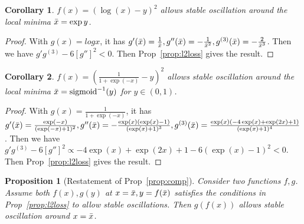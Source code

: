 \documentclass{article}
\theoremstyle{plain}
\newtheorem{coro}{Corollary}
\newtheorem{prop}{Proposition}
\theoremstyle{remark}
\newcommand{\T}[1]{^{(#1)}}
\begin{document}
\begin{coro}
    $f(x)=(\log(x)-y)^2$ allows stable oscillation around the local minima $\Bar{x}=\exp{y}$.
    \label{cor:log}
\end{coro}
\begin{proof}
    With $g(x)=log{x}$, it has $g'(\Bar{x})=\frac{1}{\Bar{x}}, g''(\Bar{x})=-\frac{1}{\Bar{x}^2}, g^{(3)}(\Bar{x})=-\frac{2}{\Bar{x}^3}$. Then we have $g'g\T{3}-6[g'']^2<0.$ Then Prop~\ref{prop:l2loss} gives the result.
\end{proof}
\begin{coro}
    $f(x)=(\frac{1}{1+\exp(-x)}-y)^2$ allows stable oscillation around the local minima $\Bar{x}=\text{sigmoid}^{-1}(y)$ for $y\in(0,1)$.
    \label{cor:sigmoid}
\end{coro}
\begin{proof}
    With $g(x)=\frac{1}{1+\exp(-x)}$, it has $g'(\Bar{x})=\frac{\exp(-x)}{(\exp(-x)+1)^2}, g''(\Bar{x})=-\frac{\exp(x)(\exp(x)-1)}{(\exp(x)+1)^3}, g^{(3)}(\Bar{x})=\frac{\exp(x)(-4\exp(x)+\exp(2x)+1)}{(\exp(x)+1)^4}$. Then we have $g'g\T{3}-6[g'']^2 \propto -4\exp(x)+\exp(2x)+1-6(\exp(x)-1)^2<0.$ Then Prop~\ref{prop:l2loss} gives the result.
\end{proof}
\begin{prop}[Restatement of Prop~\ref{prop:comp}]
    Consider two functions $f,g$. Assume both $f(x),g(y)$ at $x=\Bar{x}, y=f(\Bar{x})$ satisfies the conditions in Prop~\ref{prop:l2loss} to allow stable oscillations. Then $g(f(x))$ allows stable oscillation around $x=\Bar{x}$.
\end{prop}
\end{document}
